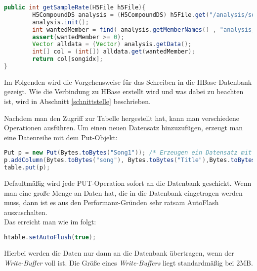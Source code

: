 \begin{lstlisting}[language=Java]
public int getSampleRate(H5File h5File){
        H5CompoundDS analysis = (H5CompoundDS) h5File.get("/analysis/songs");
        analysis.init();
        int wantedMember = find( analysis.getMemberNames() , "analysis_sample_rate");
        assert(wantedMember >= 0);
        Vector alldata = (Vector) analysis.getData();
        int[] col = (int[]) alldata.get(wantedMember);
        return col[songidx];
}
\end{lstlisting}

Im Folgenden wird die Vorgehensweise für das Schreiben in die HBase-Datenbank gezeigt. Wie die Verbindung zu HBase erstellt wird und was dabei zu beachten ist, wird in Abschnitt \ref{schnittstelle} beschrieben.

Nachdem man den Zugriff zur Tabelle hergestellt hat, kann man verschiedene Operationen ausführen.
Um einen neuen Datensatz hinzuzufügen, erzeugt man eine Datenreihe mit dem Put-Objekt:

\begin{lstlisting}[language=Java]
Put p = new Put(Bytes.toBytes("Song1")); /* Erzeugen ein Datensatz mit dem RowKey = "Song1'' */
p.addColumn(Bytes.toBytes("song"), Bytes.toBytes("Title"),Bytes.toBytes("HISTORY")); /* Erzeuge fuer diesen RowKey inder Spaltenfamileie "Song" die Splate "Title" mit dem Wert "HISTORY" */
table.put(p);
\end{lstlisting}

Defaultmäßig wird jede PUT-Operation sofort an die Datenbank geschickt. Wenn man eine große Menge an Daten hat, die in die Datenbank eingetragen werden muss, dann ist es aus den Performanz-Gründen sehr ratsam AutoFlash auszuschalten. \\
Das erreicht man wie im folgt:
\begin{lstlisting}[language=Java]
htable.setAutoFlush(true);
\end{lstlisting}
Hierbei werden die Daten nur dann an die Datenbank übertragen, wenn der \textit{Write-Buffer} voll ist. Die Größe eines \textit{Write-Buffers} liegt standardmäßig bei 2MB. 



